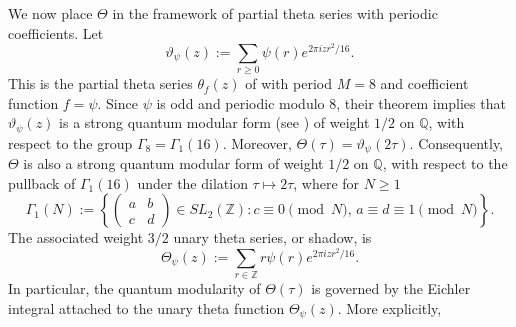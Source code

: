 \documentclass[reqno]{amsart}
\theoremstyle{definition}
\theoremstyle{plain}
\newtheorem{proposition}{Proposition}
\theoremstyle{remark}
\numberwithin{equation}{section}
\begin{document}

We now place \(\Theta\) in the framework of partial theta series with periodic
coefficients.  Let
\[
\vartheta_{\psi}(z)
:=
\sum_{r\ge0}\psi(r)e^{2\pi i z r^2/16}.
\]
This is the partial theta series \(\theta_f(z)\) of \cite{Goswami-Osburn} with
period \(M=8\) and coefficient function \(f=\psi\).  Since \(\psi\) is odd and
periodic modulo \(8\), their theorem implies that \(\vartheta_{\psi}(z)\) is a
strong quantum modular form (see \cite[pp 453]{Goswami-Osburn}) of weight \(1/2\) on \(\mathbb Q\), with respect to
the group $\Gamma_8=\Gamma_1(16)$. Moreover, $\Theta(\tau)=\vartheta_{\psi}(2\tau)$. Consequently, \(\Theta\) is also a strong quantum modular form of weight
\(1/2\) on \(\mathbb Q\), with respect to the pullback of \(\Gamma_1(16)\) under
the dilation \(\tau\mapsto 2\tau\), where for $N\ge 1$
\begin{equation*}
\Gamma_1(N):=\left\{\begin{pmatrix}
a&b\\c&d    
\end{pmatrix}\in SL_2(\mathbb{Z}): c\equiv 0\!\!\pmod{N},\,a\equiv d\equiv 1\!\!\pmod{N}\right\}.    
\end{equation*}
The associated weight \(3/2\) unary theta series, or shadow, is
\begin{equation}\label{eq:shadow}
\Theta_{\psi}(z)
:=
\sum_{r\in\mathbb Z}r\psi(r)e^{2\pi i z r^2/16}.
\end{equation}
In particular, the quantum modularity of \(\Theta(\tau)\) is governed by the
Eichler integral attached to the unary theta function
\(\Theta_{\psi}(z)\).  More explicitly, 
\end{document}
